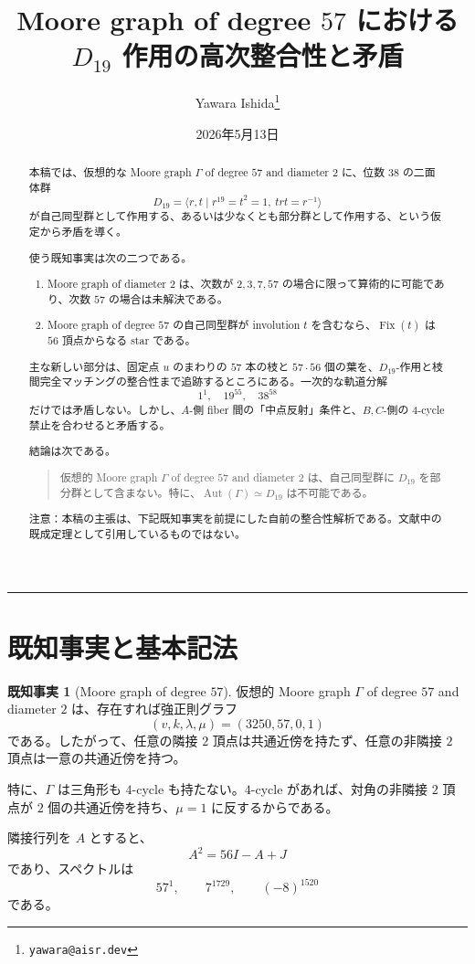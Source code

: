 \documentclass[11pt,a4paper]{article}
\title{Moore graph of degree $57$ における $D_{19}$ 作用の高次整合性と矛盾}
\author{Yawara Ishida\thanks{\texttt{yawara@aisr.dev}}}
\date{2026年5月13日}
\theoremstyle{plain}
\theoremstyle{definition}
\newtheorem{fact}[theorem]{既知事実}
\theoremstyle{remark}
\DeclareMathOperator{\Fix}{Fix}
\DeclareMathOperator{\Aut}{Aut}
\begin{document}
\maketitle

\begin{abstract}
本稿では、仮想的な Moore graph $\Gamma$ of degree $57$ and diameter $2$ に、位数 $38$ の二面体群
\[
D_{19}=\langle r,t\mid r^{19}=t^2=1,\ trt=r^{-1}\rangle
\]
が自己同型群として作用する、あるいは少なくとも部分群として作用する、という仮定から矛盾を導く。

使う既知事実は次の二つである。
\begin{enumerate}[label=(\arabic*)]
  \item Moore graph of diameter $2$ は、次数が $2,3,7,57$ の場合に限って算術的に可能であり、次数 $57$ の場合は未解決である。
  \item Moore graph of degree $57$ の自己同型群が involution $t$ を含むなら、$\Fix(t)$ は $56$ 頂点からなる star である。
\end{enumerate}

主な新しい部分は、固定点 $u$ のまわりの $57$ 本の枝と $57\cdot 56$ 個の葉を、$D_{19}$-作用と枝間完全マッチングの整合性まで追跡するところにある。一次的な軌道分解
\[
1^1,\quad 19^{55},\quad 38^{58}
\]
だけでは矛盾しない。しかし、$A$-側 fiber 間の「中点反射」条件と、$B,C$-側の $4$-cycle 禁止を合わせると矛盾する。

結論は次である。
\begin{quote}
仮想的 Moore graph $\Gamma$ of degree $57$ and diameter $2$ は、自己同型群に $D_{19}$ を部分群として含まない。特に、$\Aut(\Gamma)\simeq D_{19}$ は不可能である。
\end{quote}

\noindent 注意：本稿の主張は、下記既知事実を前提にした自前の整合性解析である。文献中の既成定理として引用しているものではない。
\end{abstract}

\bigskip
\hrule
\bigskip

\section{既知事実と基本記法}

\begin{fact}[Moore graph of degree $57$]
仮想的 Moore graph $\Gamma$ of degree $57$ and diameter $2$ は、存在すれば強正則グラフ
\[
(v,k,\lambda,\mu)=(3250,57,0,1)
\]
である。したがって、任意の隣接 $2$ 頂点は共通近傍を持たず、任意の非隣接 $2$ 頂点は一意の共通近傍を持つ。

特に、$\Gamma$ は三角形も $4$-cycle も持たない。$4$-cycle があれば、対角の非隣接 $2$ 頂点が $2$ 個の共通近傍を持ち、$\mu=1$ に反するからである。

隣接行列を $A$ とすると、
\[
A^2 = 56I - A + J
\]
であり、スペクトルは
\[
57^1,\qquad 7^{1729},\qquad (-8)^{1520}
\]
である。
\end{fact}
\end{document}
